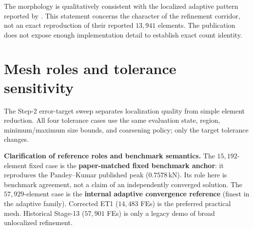 \documentclass[10pt,a4paper]{article}
\newcommand{\evidencebox}[2]{%
  \begin{tcolorbox}[colback=#1!5!white,colframe=#1!70!black,boxrule=0.45pt,
    arc=1pt,left=5pt,right=5pt,top=3pt,bottom=3pt,before skip=4pt,after skip=4pt]
    \small #2
  \end{tcolorbox}}
\begin{document}
The morphology is qualitatively consistent with the localized adaptive pattern reported by \citet{pandey2025}. This statement concerns the character of the refinement corridor, not an exact reproduction of their reported $13{,}941$ elements. The publication does not expose enough implementation detail to establish exact count identity.

\clearpage
\section{Mesh roles and tolerance sensitivity}

The Step-2 error-target sweep separates localization quality from simple element reduction. All four tolerance cases use the same evaluation state, region, minimum/maximum size bounds, and coarsening policy; only the target tolerance changes.

\evidencebox{reportamber}{\textbf{Clarification of reference roles and benchmark semantics.} The $15{,}192$-element fixed case is the \textbf{paper-matched fixed benchmark anchor}: it reproduces the Pandey--Kumar published peak ($0.7578\,\mathrm{kN}$). Its role here is benchmark agreement, not a claim of an independently converged solution. The $57{,}929$-element case is the \textbf{internal adaptive convergence reference} (finest in the adaptive family). Corrected ET1 ($14{,}483$ FEs) is the preferred practical mesh. Historical Stage-13 ($57{,}901$ FEs) is only a legacy demo of broad unlocalized refinement.}
\end{document}
